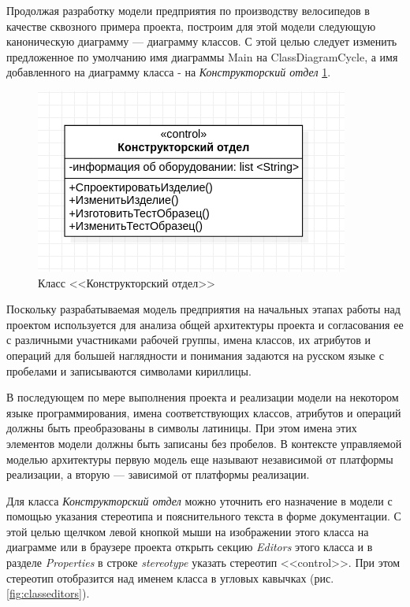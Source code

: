 \documentclass[a4paper,12pt]{report}
\begin{document}
Продолжая разработку модели предприятия по производству велосипедов в качестве сквозного примера проекта, построим для этой модели следующую каноническую диаграмму --- диаграмму классов. С этой целью следует изменить предложенное по умолчанию имя диаграммы Main на ClassDiagramCycle, а имя добавленного на диаграмму класса - на \textit{Конструкторский отдел} \ref{fig:constructclass}.

\begin{figure}[h!]
	\centering
	\includegraphics[width=0.7\linewidth]{images/constructclass}
	\caption{Класс <<Конструкторский отдел>>}
	\label{fig:constructclass}
\end{figure}


Поскольку разрабатываемая модель предприятия на начальных этапах работы над проектом используется для анализа общей архитектуры проекта и согласования ее с различными участниками рабочей группы, имена классов, их атрибутов и операций для большей наглядности и понимания задаются на русском языке с пробелами и записываются символами кириллицы.

В последующем по мере выполнения проекта и реализации модели на некотором языке программирования, имена соответствующих классов, атрибутов и операций должны быть преобразованы в символы латиницы. При этом имена этих элементов модели должны быть записаны без пробелов. В контексте управляемой моделью архитектуры первую модель еще называют независимой от платформы реализации, а вторую --- зависимой от платформы реализации.

Для класса \textit{Конструкторский отдел} можно уточнить его назначение в модели с помощью указания стереотипа и пояснительного текста в форме документации. С этой целью щелчком левой кнопкой мыши на изображении этого класса на диаграмме или в браузере проекта открыть секцию \textit{Editors} этого класса и в разделе \textit{Properties} в строке \textit{stereotype} указать стереотип <<control>>. При этом стереотип отобразится над именем класса в угловых кавычках (рис. \ref{fig:classeditors}).
\end{document}
